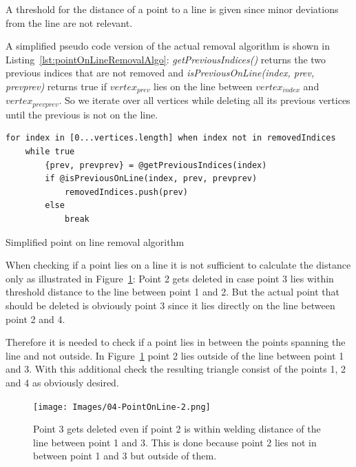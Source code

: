 \documentclass[../ClassicThesis.tex]{subfiles}
\begin{document}
A threshold for the distance of a point to a line is given since minor deviations from the line are not relevant.

A simplified pseudo code version of the actual removal algorithm is shown in Listing~\ref{lst:pointOnLineRemovalAlgo}: \emph{getPreviousIndices()} returns the two previous indices that are not removed and \emph{isPreviousOnLine(index, prev, prevprev)} returns true if $ vertex_{prev}$ lies on the line between $vertex_{index}$ and $vertex_{prevprev}$. So we iterate over all vertices while deleting all its previous vertices until the previous is not on the line.

\begin{listing}[!h]
\centering
\begin{verbatim}
for index in [0...vertices.length] when index not in removedIndices
    while true
        {prev, prevprev} = @getPreviousIndices(index)
        if @isPreviousOnLine(index, prev, prevprev)
            removedIndices.push(prev)
        else
            break
\end{verbatim}
\caption{Simplified point on line removal algorithm}
\label{lst:pointOnLineRemovalAlgo}
\end{listing}


When checking if a point lies on a line it is not sufficient to calculate the distance only as illustrated in Figure~\ref{fig:pointOnLine2}: Point 2 gets deleted in case point 3 lies within threshold distance to the line between point 1 and 2. But the actual point that should be deleted is obviously point 3 since it lies directly on the line between point 2 and 4.

Therefore it is needed to check if a point lies in between the points spanning the line and not outside. In Figure~\ref{fig:pointOnLine2} point 2 lies outside of the line between point 1 and 3. With this additional check the resulting triangle consist of the points 1, 2 and 4 as obviously desired.


\begin{figure}
    \texttt{[image: Images/04-PointOnLine-2.png]}
    \caption{Point 3 gets deleted even if point 2 is within welding distance of the line between point 1 and 3. This is done because point 2 lies not in between point 1 and 3 but outside of them.}
    \label{fig:pointOnLine2}
\end{figure}




\end{document}
